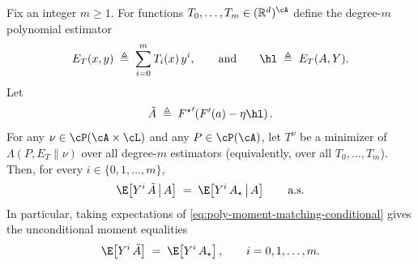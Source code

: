 \begin{theorem}
    Fix an integer $m\ge 1$. For functions $T_0,\dots,T_m\in(\mathbb{R}^d)^{\cA}$ define the
    degree-$m$ polynomial estimator
    \[
        E_T(x,y)\;\triangleq\;\sum_{i=0}^m T_i(x)\,y^i,
        \qquad\text{and}\qquad
        \hl \;\triangleq\; E_T(A,Y).
    \]
    Let
    \[
        \tilde{A}\;\triangleq\; {F^\star}'\!\left(F'(a)-\eta \hl\right).
    \]
    For any $\nu\in\cP(\cA\times\cL)$ and any $P\in\cP(\cA)$, let $T^\nu$ be a minimizer of
    $\Lambda(P,E_T\|\nu)$ over all degree-$m$ estimators (equivalently, over all $T_0,\dots,T_m$).
    Then, for every $i\in\{0,1,\dots,m\}$,
    \begin{equation}
        \E\!\left[Y^i\,\tilde{A}\,\middle|\,A\right]
        \;=\;
        \E\!\left[Y^i\,A_\star\,\middle|\,A\right]
        \qquad\text{a.s.}
        \label{eq:poly-moment-matching-conditional}
    \end{equation}
    In particular, taking expectations of \eqref{eq:poly-moment-matching-conditional} gives the unconditional
    moment equalities
    \[
        \E\!\left[Y^i\,\tilde{A}\right] \;=\; \E\!\left[Y^i\,A_\star\right],
        \qquad i=0,1,\dots,m.
    \]
\end{theorem}

